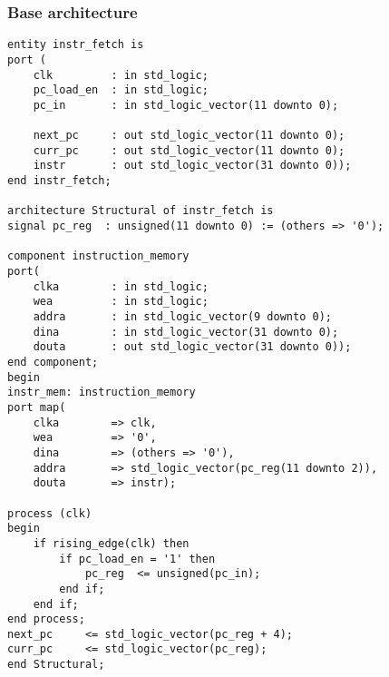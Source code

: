 \subsubsection{Base architecture}
\begin{code}
\label{code:IF_code}   

\begin{verbatim}
entity instr_fetch is
port ( 
    clk         : in std_logic;
    pc_load_en  : in std_logic;
    pc_in       : in std_logic_vector(11 downto 0);
    
    next_pc     : out std_logic_vector(11 downto 0);
    curr_pc     : out std_logic_vector(11 downto 0);
    instr       : out std_logic_vector(31 downto 0));
end instr_fetch;

architecture Structural of instr_fetch is
signal pc_reg  : unsigned(11 downto 0) := (others => '0');

component instruction_memory
port(
    clka        : in std_logic;
    wea         : in std_logic;
    addra       : in std_logic_vector(9 downto 0);
    dina        : in std_logic_vector(31 downto 0);
    douta       : out std_logic_vector(31 downto 0));
end component;
begin
instr_mem: instruction_memory 
port map(
    clka        => clk,
    wea         => '0',
    dina        => (others => '0'),
    addra       => std_logic_vector(pc_reg(11 downto 2)),
    douta       => instr);

process (clk)
begin
    if rising_edge(clk) then
        if pc_load_en = '1' then
            pc_reg  <= unsigned(pc_in);
        end if;
    end if;
end process;
next_pc     <= std_logic_vector(pc_reg + 4);
curr_pc     <= std_logic_vector(pc_reg);
end Structural;
\end{verbatim}
\end{code}
\newpage


